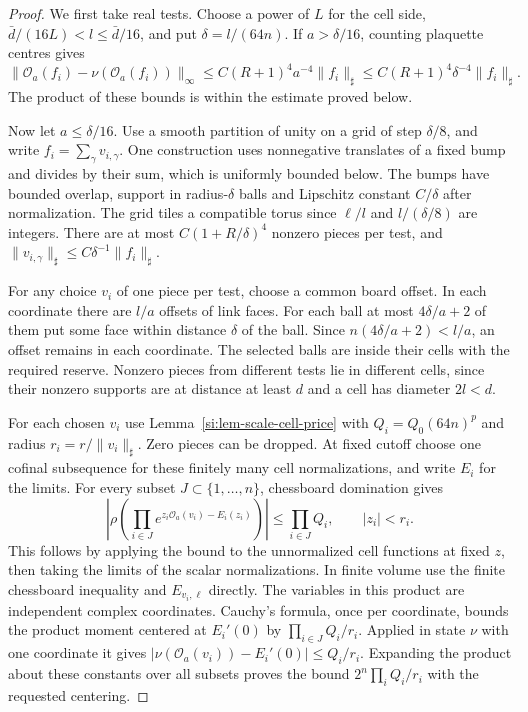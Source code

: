 \documentclass[11pt,letterpaper,reqno]{amsart}
\numberwithin{equation}{section}
\theoremstyle{definition}
\theoremstyle{remark}
\begin{document}
\begin{proof}
We first take real tests. Choose a power of $L$ for the cell side,
$\bar d/(16L)<l\le\bar d/16$, and put $\delta=l/(64n)$.
If $a>\delta/16$, counting plaquette centres gives
\[
 \|\mathcal O_a(f_i)-\nu(\mathcal O_a(f_i))\|_\infty
 \le C(R+1)^4a^{-4}\|f_i\|_\sharp
 \le C(R+1)^4\delta^{-4}\|f_i\|_\sharp.
\]
The product of these bounds is within the estimate proved below.

Now let $a\le\delta/16$. Use a smooth partition of unity on a
grid of step $\delta/8$, and write $f_i=\sum_\gamma v_{i,\gamma}$.
One construction uses nonnegative translates of a fixed bump and
divides by their sum, which is uniformly bounded below. The bumps
have bounded overlap, support in radius-$\delta$ balls and
Lipschitz constant $C/\delta$ after normalization. The grid
tiles a compatible torus since $\ell/l$ and $l/(\delta/8)$ are
integers. There are at most $C(1+R/\delta)^4$ nonzero pieces per
test, and $\|v_{i,\gamma}\|_\sharp\le
C\delta^{-1}\|f_i\|_\sharp$.

For any choice $v_i$ of one piece per test, choose a common board
offset. In each coordinate there are $l/a$ offsets of link faces.
For each ball at most $4\delta/a+2$ of them put some face within
distance $\delta$ of the ball. Since $n(4\delta/a+2)<l/a$, an
offset remains in each coordinate. The selected balls are inside
their cells with the required reserve. Nonzero pieces from
different tests lie in different cells, since their nonzero
supports are at distance at least $d$ and a cell has diameter
$2l<d$.

For each chosen $v_i$ use Lemma~\ref{si:lem-scale-cell-price} with
$Q_i=Q_0(64n)^p$ and radius $r_i=r/\|v_i\|_\sharp$. Zero pieces can
be dropped. At fixed cutoff choose one cofinal subsequence for
these finitely many cell normalizations, and write $E_i$ for the
limits. For every subset $J\subset\{1,\ldots,n\}$, chessboard
domination \cite[Theorem~C]{LP} gives
\[
 \left|\rho\!\left(\prod_{i\in J}
                 e^{z_i\mathcal O_a(v_i)-E_i(z_i)}\right)\right|
          \le \prod_{i\in J}Q_i,\qquad |z_i|<r_i.
\]
This follows by applying the bound to the unnormalized cell
functions at fixed $z$, then taking the limits of the scalar
normalizations. In finite volume use the finite chessboard
inequality and $E_{v_i,\ell}$ directly. The variables in this
product are independent complex coordinates. Cauchy's formula,
once per coordinate, bounds the product moment centered at
$E_i'(0)$ by $\prod_{i\in J}Q_i/r_i$. Applied in state $\nu$
with one coordinate it gives
$|\nu(\mathcal O_a(v_i))-E_i'(0)|\le Q_i/r_i$.
Expanding the product about these constants over all subsets
proves the bound $2^n\prod_i Q_i/r_i$ with the requested
centering.


\end{proof}
\end{document}
